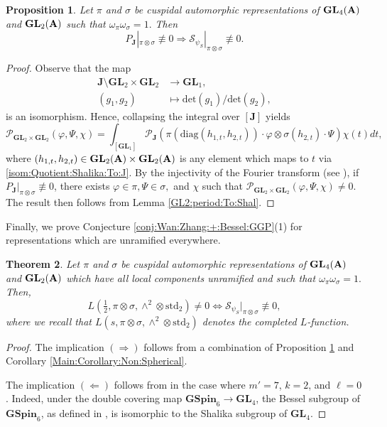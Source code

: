 \documentclass[11pt, reqno]{amsart}
\theoremstyle{plain}
\newtheorem{theorem}{Theorem}[section]
\newtheorem{proposition}[theorem]{Proposition}
\theoremstyle{definition}
\theoremstyle{remark}
\theoremstyle{plain}
\def\A{{\bf A}}
\def\GSpin{{\mathbf{GSpin}}}
\def\GL{\mathbf{GL}}
\begin{document}
\begin{proposition}\label{J:Period:To:GL2}
    Let $\pi$ and $\sigma$ be cuspidal automorphic representations of $\GL_4(\A)$ and $\GL_2(\A)$ such that $\omega_\pi \omega_\sigma = 1.$ Then $$P_{\mathbf{J}}|_{\pi\otimes\sigma}\not \equiv 0 \Longrightarrow \mathcal{S}_{\psi_S}|_{\pi\otimes\sigma}\not \equiv 0.$$
\end{proposition}
\begin{proof}
    Observe that the map \begin{align}\label{isom:Quotient:Shalika:To:J}
    \mathbf{J}\setminus \GL_2\times\GL_2&\to \GL_1,\\
    (g_1,g_2)&\mapsto \mathrm{det}(g_1)/\mathrm{det}(g_2),\nonumber
    \end{align}
    is an isomorphism. Hence, collapsing the integral over $[\mathbf{J}]$ yields
    \[\mathcal{P}_{\GL_2\times\GL_2}(\varphi,\Psi,\chi) = \int_{[\GL_1]}\mathcal{P}_{\mathbf{J}}(\pi(\mathrm{diag}(h_{1,t},h_{2,t})) \cdot   \varphi \otimes \sigma(h_{2,t}) \cdot \Psi) \chi(t)dt,\]
    where $(h_{1,t},h_{2,t})\in \GL_2(\A)\times\GL_2(\A)$ is any element which maps to $t$ via \eqref{isom:Quotient:Shalika:To:J}. By the injectivity of the Fourier transform  (see \cite[Corollary 4.34]{Folland:Harmonic:Analysis}), if $P_{\mathbf{J}}|_{\pi\otimes\sigma}\not \equiv 0$, there exists $\varphi \in \pi, \Psi \in \sigma,$ and $\chi$ such that $\mathcal{P}_{\GL_2\times\GL_2}(\varphi,\Psi,\chi) \ne 0$. The result then follows from Lemma \ref{GL2:period:To:Shal}.
\end{proof}





Finally, we prove Conjecture \ref{conj:Wan:Zhang:+:Bessel:GGP}(1) for representations which are unramified everywhere.


\begin{theorem}\label{Final:Theorem:Shalika}
    Let $\pi$ and $\sigma$ be cuspidal automorphic representations of $\GL_4(\A)$ and $\GL_2(\A)$ which have all local components unramified and such that $\omega_\pi \omega_\sigma = 1.$ Then, 
    \[L(\tfrac{1}{2}, \pi \otimes \sigma, \wedge^2 \otimes  \mathrm{std}_2) \neq 0 \Longleftrightarrow \mathcal{S}_{\psi_S}|_{\pi \otimes \sigma} \not \equiv 0,\]
    where we recall that $L(s, \pi \otimes \sigma, \wedge^2 \otimes  \mathrm{std}_2)$ denotes the completed $L$-function.
\end{theorem}
\begin{proof}
    The implication $(\Longrightarrow)$ follows from a combination of Proposition \ref{J:Period:To:GL2} and Corollary \ref{Main:Corollary:Non:Spherical}.

    \noindent The implication $(\Longleftarrow)$ follows from \cite[Theorem 1.3]{PanYan} in the case where $m'=7$, $k=2$, and $\ell=0$. Indeed, under the double covering map $\GSpin_6 \to \GL_4$, the Bessel subgroup of $\GSpin_6$, as defined in \cite[\S 2.2]{PanYan}, is isomorphic to the Shalika subgroup of $\GL_4$.   
\end{proof}
\end{document}
